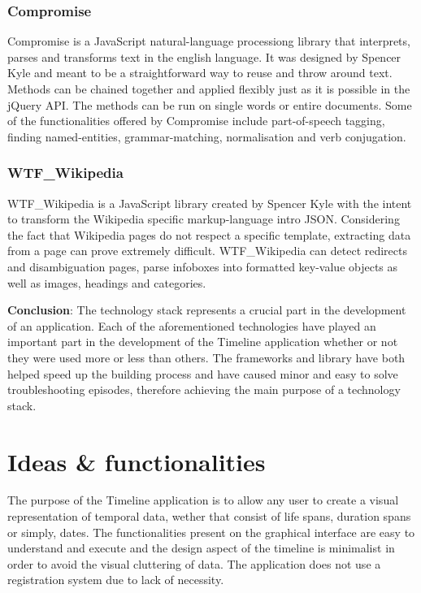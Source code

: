 \documentclass{report}
\begin{document}
\subsection {Compromise}
Compromise is a JavaScript natural-language processiong library that interprets, parses and transforms text in the english language. It was designed by Spencer Kyle and meant to be a straightforward way to reuse and throw around text. Methods can be chained together and applied flexibly just as it is possible in the jQuery API. The methods can be run on single words or entire documents. Some of the functionalities offered by Compromise include part-of-speech tagging, finding named-entities, grammar-matching, normalisation and verb conjugation. 

\subsection {WTF\_Wikipedia}
WTF\_Wikipedia is a JavaScript library created by Spencer Kyle with the intent to transform the Wikipedia specific markup-language intro JSON. Considering the fact that Wikipedia pages do not respect a specific template, extracting data from a page can prove extremely difficult. WTF\_Wikipedia can detect redirects and disambiguation pages, parse infoboxes into formatted key-value objects as well as images, headings and categories.

\textbf{Conclusion}: The technology stack represents a crucial part in the development of an application. Each of the aforementioned technologies have played an important part in the development of the Timeline application whether or not they were used more or less than others. The frameworks and library have both helped speed up the building process and have caused minor and easy to solve troubleshooting episodes, therefore achieving the main purpose of a technology stack.
\newpage

\chapter {Ideas \& functionalities}

The purpose of the Timeline application is to allow any user to create a visual representation of temporal data, wether that consist of life spans, duration spans or simply, dates. The functionalities present on the graphical interface are easy to understand and execute and the design aspect of the timeline is minimalist in order to avoid the visual cluttering of data. The application does not use a registration system due to lack of necessity.\par
\end{document}
